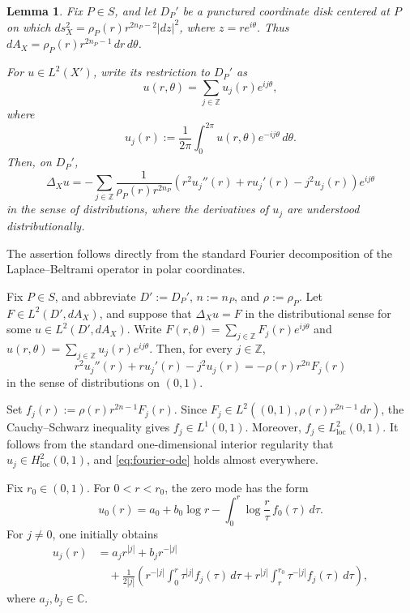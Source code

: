 \documentclass[12pt]{amsart}
\theoremstyle{plain}
\newtheorem{lem}[thm]{Lemma}
\theoremstyle{definition}
\theoremstyle{remark}
\numberwithin{equation}{section} \numberwithin{figure}{section}
\begin{document}
\begin{lem}\label{lem:fourier-decomposition}
Fix \(P\in S\), and let \(D_P'\) be a punctured coordinate disk centered
at \(P\) on which
\(ds_X^2=\rho_P(r)r^{2n_P-2}|dz|^2\), where \(z=re^{i\theta}\).
Thus \(dA_X=\rho_P(r)r^{2n_P-1}\,dr\,d\theta\).

For \(u\in L^2(X')\), write its restriction to \(D_P'\) as
\[
    u(r,\theta)=\sum_{j\in\mathbb Z}u_j(r)e^{ij\theta},
\]
where
\[
    u_j(r):=\frac{1}{2\pi}
    \int_0^{2\pi}u(r,\theta)e^{-ij\theta}\,d\theta.
\]
Then, on \(D_P'\),
\[
\Delta_Xu
=
-\sum_{j\in\mathbb Z}
\frac{1}{\rho_P(r)r^{2n_P}}
\left(
r^2u_j''(r)+ru_j'(r)-j^2u_j(r)
\right)e^{ij\theta}
\]
in the sense of distributions, where the derivatives of \(u_j\) are
understood distributionally.
\end{lem}

The assertion follows directly from the standard Fourier decomposition
of the Laplace--Beltrami operator in polar coordinates.


Fix \(P\in S\), and abbreviate \(D':=D_P'\), \(n:=n_P\), and
\(\rho:=\rho_P\). Let \(F\in L^2(D',dA_X)\), and suppose that
\(\Delta_Xu=F\) in the distributional sense for some
\(u\in L^2(D',dA_X)\). Write
\(F(r,\theta)=\sum_{j\in\mathbb Z}F_j(r)e^{ij\theta}\) and
\(u(r,\theta)=\sum_{j\in\mathbb Z}u_j(r)e^{ij\theta}\). Then, for every
\(j\in\mathbb Z\),
\begin{equation}\label{eq:fourier-ode}
r^2u_j''(r)+ru_j'(r)-j^2u_j(r)
=
-\rho(r)r^{2n}F_j(r)
\end{equation}
in the sense of distributions on \((0,1)\).

Set \(f_j(r):=\rho(r)r^{2n-1}F_j(r)\). Since
\(F_j\in L^2((0,1),\rho(r)r^{2n-1}\,dr)\), the Cauchy--Schwarz
inequality gives \(f_j\in L^1(0,1)\). Moreover,
\(f_j\in L^2_{\mathrm{loc}}(0,1)\). It follows from the standard
one-dimensional interior regularity that
\(u_j\in H^2_{\mathrm{loc}}(0,1)\), and
\eqref{eq:fourier-ode} holds almost everywhere.

Fix \(r_0\in(0,1)\). For \(0<r<r_0\), the zero mode has the form
\[
u_0(r)
=
a_0+b_0\log r
-
\int_0^r
\log\frac{r}{\tau}\,f_0(\tau)\,d\tau.
\]
For \(j\neq0\), one initially obtains
\[
\begin{aligned}
u_j(r)
&=
a_jr^{|j|}+b_jr^{-|j|} \\
&\quad
+
\frac{1}{2|j|}
\left(
r^{-|j|}\int_0^r\tau^{|j|}f_j(\tau)\,d\tau
+
r^{|j|}\int_r^{r_0}\tau^{-|j|}f_j(\tau)\,d\tau
\right),
\end{aligned}
\]
where \(a_j,b_j\in\mathbb C\).
\end{document}
